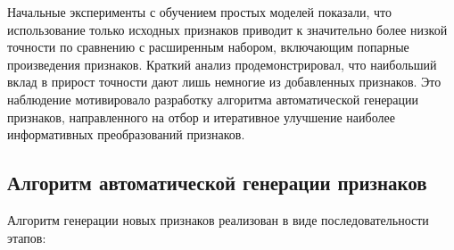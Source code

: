 \documentclass[a4paper,12pt]{article}
\begin{document}
  Начальные эксперименты с обучением простых моделей показали, что использование только исходных признаков приводит к значительно более низкой точности по сравнению с расширенным набором, включающим попарные произведения признаков. Краткий анализ продемонстрировал, что наибольший вклад в прирост точности дают лишь немногие из добавленных признаков. Это наблюдение мотивировало разработку алгоритма автоматической генерации признаков, направленного на отбор и итеративное улучшение наиболее информативных преобразований признаков.
  
  \subsection{Алгоритм автоматической генерации признаков}
  
    Алгоритм генерации новых признаков реализован в виде последовательности этапов:
\end{document}
